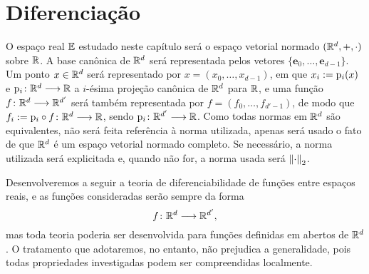 \chapter{Diferenciação}

O espaço real $\mathbb{E}$ estudado neste capítulo será o espaço vetorial normado $(\mathbb{R}^d,+,\cdot)$ sobre $\mathbb{R}$. A base canônica de $\mathbb{R}^d$ será representada pelos vetores $\{\bm e_0, \ldots, \bm e_{d-1}\}$. Um ponto $x \in \mathbb{R}^d$ será representado por $x=(x_0,\ldots,x_{d-1})$, em que $x_i := \mathrm{p}_i(x)$ e ${\mathrm{p}_i}\colon {\mathbb{R}^d} \longrightarrow {\mathbb{R}}$ a $i$-ésima projeção canônica de $\mathbb{R}^d$ para $\mathbb{R}$, e uma função ${f}\colon {\mathbb{R}^d} \longrightarrow {\mathbb{R}^{d'}}$ será também representada por $f=(f_0,\ldots,f_{d'-1})$, de modo que $f_i := {\mathrm{p}_i \circ f}\colon {\mathbb{R}^d} \longrightarrow {\mathbb{R}}$, sendo ${\mathrm{p}_i}\colon {\mathbb{R}^{d'}} \longrightarrow {\mathbb{R}}$. Como todas normas em $\mathbb{R}^d$ são equivalentes, não será feita referência à norma utilizada, apenas será usado o fato de que $\mathbb{R}^d$ é um espaço vetorial normado completo. Se necessário, a norma utilizada será explicitada e, quando não for, a norma usada será $\left\Vert{\cdot}\right\Vert_2$.

Desenvolveremos a seguir a teoria de diferenciabilidade de funções entre espaços reais, e as funções consideradas serão sempre da forma
	\begin{equation*}
	{f}\colon {\mathbb{R}^d} \longrightarrow {\mathbb{R}^{d'}},
	\end{equation*}
mas toda teoria poderia ser desenvolvida para funções definidas em abertos de $\mathbb{R}^d$. O tratamento que adotaremos, no entanto, não prejudica a generalidade, pois todas propriedades investigadas podem ser compreendidas localmente.


